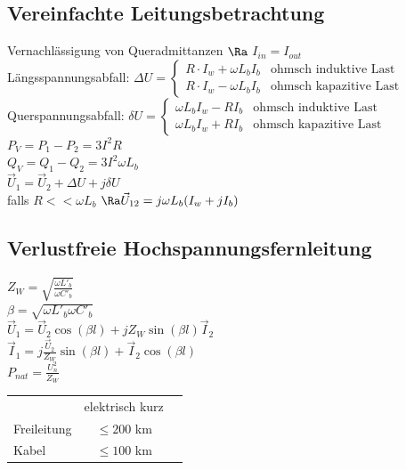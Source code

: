 \documentclass[european]{latex4ei_sheet}
\begin{document}
		\subsection{Vereinfachte Leitungsbetrachtung}
		
		
		Vernachlässigung von Queradmittanzen $\Ra$ $I_{in} = I_{out}$\\
		Längsspannungsabfall: $\Delta U = \begin{cases} R \cdot I_w + \omega L_b I_b & \text{ohmsch induktive Last} \\ R \cdot I_w - \omega L_b I_b  & \text{ohmsch kapazitive Last} \end{cases} $\\
		Querspannungsabfall: $\delta U = \begin{cases} \omega L_b I_w - R I_b & \text{ohmsch induktive Last} \\ \omega L_b I_w + R I_b & \text{ohmsch kapazitive Last} \end{cases}$\\
		$P_V = P_1 - P_2 = 3 I^2 R$ \\
		$Q_V = Q_1 - Q_2 = 3 I^2 \omega L_b$ \\
		$\vec U_1 = \vec U_2 + \Delta U + j \delta U$ \\
		falls $R << \omega L_b$ \quad $\Ra \vec U_{12} = j \omega L_b (I_w + j I_b)$
		
		\subsection{Verlustfreie Hochspannungsfernleitung}
		
		
		$Z_W = \sqrt{\frac{\omega L'_b}{\omega C'_b}}$ \\
		$\beta = \sqrt{\omega L'_b \omega C'_b}$ \\
		$\vec U_1 = \vec U_2 \cos (\beta l) + j Z_W \sin (\beta l) \vec I_2$ \\
		$\vec I_1 = j \frac{\vec U_2}{Z_W} \sin (\beta l) + \vec I_2 \cos (\beta l)$ \\
		$P_{nat} = \frac{U_n^2}{Z_W}$ \\
		
		\begin{tabular}{lcc}
		 & elektrisch kurz \\
		Freileitung & $\le 200$ km \\
		Kabel & $\le 100$ km
		\end{tabular}
\end{document}
